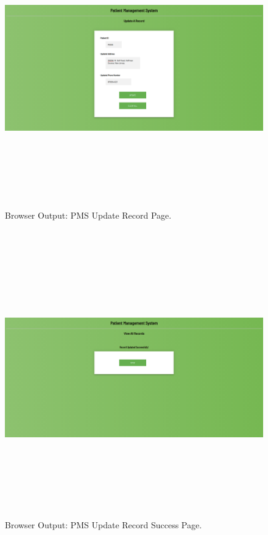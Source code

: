 \documentclass[12pt, a4]{article}
\begin{document}
\newpage
\subsection*{}
\begin{figure}[h]
\centering
\caption{Browser Output: PMS Update Record Page.}
\includegraphics[height=12cm, width=18cm]{Output/PMSUpdate.png}
\end{figure}

\newpage
\subsection*{}
\begin{figure}[h]
\centering
\caption{Browser Output: PMS Update Record Success Page.}
\includegraphics[height=12cm, width=16cm]{Output/PMSUpdateDone.png}
\end{figure}
\end{document}
